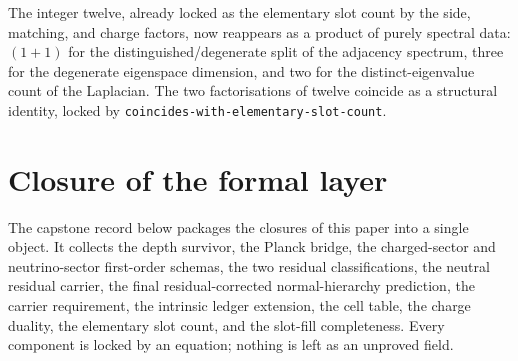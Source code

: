 \documentclass[11pt]{article}
\begin{document}
\begin{code}
\<%
\\
%
\>[2]\AgdaSymbol{;}\AgdaSpace{}%
%
\>[35]\AgdaSymbol{=}\AgdaSpace{}%
\<%
\\
%
\>[2]\AgdaSymbol{;}\AgdaSpace{}%
%
\>[35]\AgdaSymbol{=}\AgdaSpace{}%
\<%
\\
%
\>[2]\AgdaSymbol{;}\AgdaSpace{}%
%
\>[35]\AgdaSymbol{=}\AgdaSpace{}%
\<%
\\
%
\>[2]\AgdaSymbol{;}\AgdaSpace{}%
%
\>[35]\AgdaSymbol{=}\AgdaSpace{}%
\<%
\\
%
\>[2]\AgdaSymbol{;}\AgdaSpace{}%
%
\>[35]\AgdaSymbol{=}\AgdaSpace{}%
\<%
\\
%
\>[2]\AgdaSymbol{;}\AgdaSpace{}%
%
\>[35]\AgdaSymbol{=}\AgdaSpace{}%
\<%
\\
%
\>[2]\AgdaSymbol{;}\AgdaSpace{}%
%
\>[35]\AgdaSymbol{=}\AgdaSpace{}%
\<%
\\
%
\>[2]\AgdaSymbol{;}\AgdaSpace{}%
%
\>[35]\AgdaSymbol{=}\AgdaSpace{}%
\<%
\\
%
\>[2]\AgdaSymbol{;}\AgdaSpace{}%
\AgdaSpace{}%
\AgdaSymbol{=}\AgdaSpace{}%
\<%
\\
%
\>[2]\AgdaSymbol{\}}\<%
\end{code}

The integer twelve, already locked as the elementary slot count by the
side, matching, and charge factors, now reappears as a product of
purely spectral data: $(1+1)$ for the distinguished/degenerate split of
the adjacency spectrum, three for the degenerate eigenspace dimension,
and two for the distinct-eigenvalue count of the Laplacian.  The two
factorisations of twelve coincide as a structural identity, locked by
\texttt{coincides-with-elementary-slot-count}.

\section{Closure of the formal layer}

The capstone record below packages the closures of this paper into a
single object.  It collects the depth survivor, the Planck bridge, the
charged-sector and neutrino-sector first-order schemas, the two
residual classifications, the neutral residual carrier, the final
residual-corrected normal-hierarchy prediction, the carrier requirement,
the intrinsic ledger extension, the cell table, the charge duality, the
elementary slot count, and the slot-fill completeness.  Every component
is locked by an equation; nothing is left as an unproved field.
\end{document}
